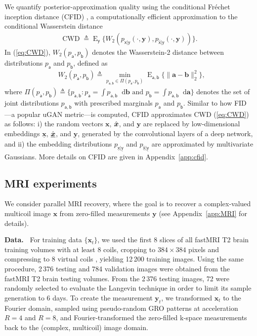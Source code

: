 \documentclass{article}
\theoremstyle{plain}
\theoremstyle{definition}
\theoremstyle{remark}
\renewcommand{\hat}{\widehat}
\newcommand{\defn}{\triangleq}
\newcommand{\uvec}[1]{\ensuremath{\underline{\boldsymbol{#1}}}}
\newcommand{\hvec}[1]{\ensuremath{\Hat{\boldsymbol{#1}}}}
\renewcommand{\vec}[1]{\ensuremath{\boldsymbol{#1}}}
\newcommand{\huvec}[1]{\ensuremath{\Hat{\underline{\boldsymbol{#1}}}}}
\newcommand*\deriv{\mathop{}\!\mathrm{d}}
\DeclareMathOperator{\E}{E}
\renewcommand{\eqref}[1]{(\ref{eq:#1})}
\newcommand{\appref}[1]{Appendix~\ref{app:#1}}
\newcommand{\pa}{p_{\mathsf{a}}}
\newcommand{\pb}{p_{\mathsf{b}}}
\newcommand{\pab}{p_{\mathsf{a,b}}}
\newcommand{\pxgy}{p_{\mathsf{x}|\mathsf{y}}}
\newcommand{\pxhgy}{p_{\hat{\mathsf{x}}|\mathsf{y}}}
\newcommand{\Eab}{\E_{\mathsf{a,b}}}
\newcommand{\Ey}{\E_{\mathsf{y}}}
\DeclareMathOperator{\CWD}{CWD}
\newcommand{\pxugyu}{p_{\underline{\mathsf{x}}|\underline{\mathsf{y}}}}
\newcommand{\pxuhgyu}{p_{\hat{\underline{\mathsf{x}}}|\underline{\mathsf{y}}}}
\begin{document}
We quantify posterior-approximation quality using the conditional Fr\'{e}chet inception distance (CFID) \cite{Soloveitchik:21}, a computationally efficient approximation to the conditional Wasserstein distance
\begin{align}
\CWD \defn \Ey\{W_2(\pxgy(\cdot,\vec{y}),\pxhgy(\cdot,\vec{y}))\} 
\label{eq:CWD} .
\end{align}
In \eqref{CWD}, $W_2(\pa,\pb)$ denotes the Wasserstein-2 distance between distributions $\pa$ and $\pb$, defined as
\begin{align}
&W_2(\pa,\pb) 
\defn \min_{\pab\in \Pi(\pa,\pb)} \Eab\{\|\vec{a}-\vec{b}\|^2_2\} 
\label{eq:Pi} ,
\end{align}
where $\Pi(\pa,\pb) \defn \textstyle \big\{\pab : \pa=\int \pab\deriv \vec{b} \text{~and~} \pb=\int \pab \deriv \vec{a} \big\} $ denotes the set of joint distributions $\pab$ with prescribed marginals $\pa$ and $\pb$.
Similar to how FID \cite{Heusel:NIPS:17}---a popular uGAN metric---is computed, CFID approximates CWD \eqref{CWD} as follows:
i) the random vectors $\vec{x}$, $\hvec{x}$, and $\vec{y}$ are replaced by low-dimensional embeddings $\uvec{x}$, $\huvec{x}$, and $\uvec{y}$, generated by the convolutional layers of a deep network, and
ii) the embedding distributions $\pxugyu$ and $\pxuhgyu$ are approximated by multivariate Gaussians.
More details on CFID are given in \appref{cfid}.


\subsection{MRI experiments} \label{sec:MRIexperiments}
We consider parallel MRI recovery, where the goal is to recover a complex-valued multicoil image $\vec{x}$ from zero-filled measurements $\vec{y}$ (see \appref{MRI} for details).

\textbf{Data.~}
For training data $\{\vec{x}_t\}$, we used the first 8 slices of all fastMRI \cite{Zbontar:18} T2 brain training volumes with at least 8 coils, cropping to $384 \times 384$ pixels and compressing to 8 virtual coils \cite{Zhang:MRM:13}, yielding 12\,200 training images.
Using the same procedure, 2\,376 testing and 784 validation images were obtained from the fastMRI T2 brain testing volumes. 
From the 2\,376 testing images, 72 were randomly selected to evaluate the Langevin technique \cite{Jalal:NIPS:21} in order to limit its sample generation to 6 days.
%
To create the measurement $\vec{y}_t$, we transformed $\vec{x}_t$ to the Fourier domain, sampled using pseudo-random GRO patterns \cite{Joshi:22} at acceleration $R=4$ and $R=8$, and Fourier-transformed the zero-filled k-space measurements back to the (complex, multicoil) image domain.
\end{document}
